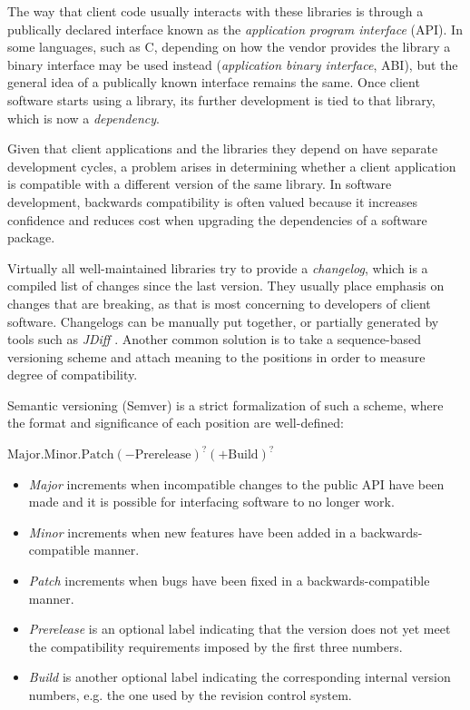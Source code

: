 \documentclass{l4proj}
\begin{document}
The way that client code usually interacts with these libraries is
through a publically declared interface known as the
\textit{application program interface} (API). In some languages, such
as C, depending on how the vendor provides the library a binary
interface may be used instead (\textit{application binary interface},
ABI), but the general idea of a publically known interface remains the
same. Once client software starts using a library, its further
development is tied to that library, which is now a
\textit{dependency}.

Given that client applications and the libraries they depend on have
separate development cycles, a problem arises in determining whether a
client application is compatible with a different version of the same
library. In software development, backwards compatibility is often
valued because it increases confidence and reduces cost when upgrading
the dependencies of a software package.

Virtually all well-maintained libraries try to provide a \textit{changelog},
which is a compiled list of changes since the last version. They usually
place emphasis on changes that are breaking, as that is most
concerning to developers of client software. Changelogs can be
manually put together, or partially generated by tools such as
\textit{JDiff} \cite{JDiff}. Another common solution is to take a
sequence-based versioning scheme and attach meaning to the positions
in order to measure degree of compatibility.

Semantic versioning \cite{SemanticVersioning} (Semver) is a strict
formalization of such a scheme, where the format and significance of
each position are well-defined:

\begin{center}
$\mathrm{Major.Minor.Patch}(-\mathrm{Prerelease})^?(+\mathrm{Build})^?$
\end{center}

\begin{itemize}
\item \textit{Major} increments when incompatible changes to the
public API have been made and it is possible for interfacing software
to no longer work.
\item \textit{Minor} increments when new features have been added in a
backwards-compatible manner.
\item \textit{Patch} increments when bugs have been fixed in a
backwards-compatible manner.
\item \textit{Prerelease} is an optional label indicating that the
version does not yet meet the compatibility requirements imposed by
the first three numbers.
\item \textit{Build} is another optional label indicating the
corresponding internal version numbers, e.g. the one used by the
revision control system.
\end{itemize}
\end{document}
